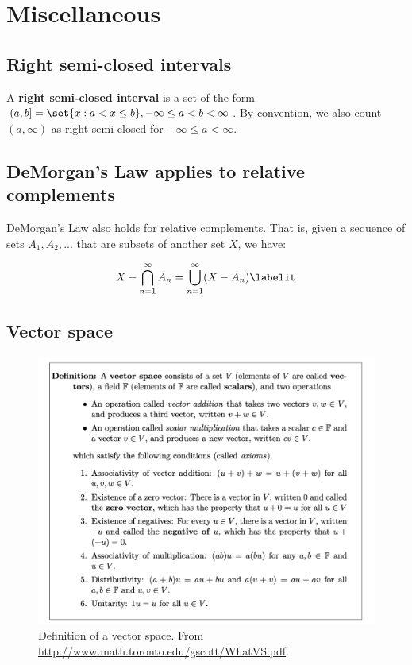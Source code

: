 \documentclass{article} %
\begin{document}
\section{Miscellaneous}
\subsection{Right semi-closed intervals}
\begin{definition}
A \textbf{right semi-closed interval} is a set of the form $(a,b] = \set{x : a < x \leq b}, -\infty \leq a < b < \infty$.  By convention, we also count $(a,\infty)$ as right semi-closed for $-\infty \leq a < \infty$. 
\label{def:rsc_intervals}
\end{definition}

\subsection{DeMorgan's Law applies to relative complements} 

\begin{remark}
DeMorgan's Law also holds for relative complements.  That is, given a sequence of sets $A_1, A_2, ...$ that are subsets of another set $X$, we have:

\begin{align*}
X - \bigcap_{n=1}^\infty A_n = \bigcup_{n=1}^\infty (X - A_n)
\labelit \label{eqn:demorgan_for_relative_complements}	
\end{align*}
\end{remark}

\subsection{Vector space} \label{sec:vector_space}

\begin{figure}[H]
\centering 
\includegraphics[width=.8\textwidth]{images/def_vector_space}
\caption{Definition of a vector space.  From \url{http://www.math.toronto.edu/gscott/WhatVS.pdf}.}
\label{fig:def_vector_space}
\end{figure}
\end{document}
